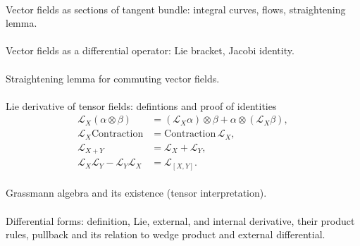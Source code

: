\documentclass{article}
\begin{document}
 
\paragraph{} Vector fields as sections of tangent bundle:
integral curves, flows, straightening lemma.


\paragraph{} Vector fields as a differential operator: Lie bracket, Jacobi identity.


\paragraph{} Straightening lemma for commuting vector fields.


\paragraph{}
Lie derivative of tensor fields: defintions and proof of identities
\[\begin{split}
\mathcal{L}_X(\alpha\otimes\beta)&=(\mathcal{L}_X\alpha)\otimes\beta+\alpha\otimes(\mathcal{L}_X\beta),
\\
\mathcal{L}_{X}\mathrm{Contraction}&=\mathrm{Contraction}\,\mathcal{L}_{X},
\\
\mathcal{L}_{X+Y}&=\mathcal{L}_X+\mathcal{L}_Y,
\\
\mathcal{L}_{X}\mathcal{L}_{Y}-\mathcal{L}_{Y}\mathcal{L}_{X}&=\mathcal{L}_{[X,Y]}.
\end{split}
\]


\paragraph{}
Grassmann algebra and its existence (tensor interpretation).


\paragraph{} Differential forms: definition, Lie, external, and internal derivative,  their product rules, pullback and its relation to wedge product and external differential.
\end{document}
